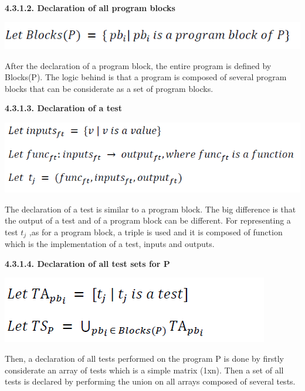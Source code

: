 \documentclass[conference,compsoc]{IEEEtran}
\begin{document}
\noindent
\newline
\textbf{4.3.1.2. Declaration of all program blocks}
\begin{center}
\includegraphics[scale=0.5]{Proof1-Part2.png} 
\end{center}

After the declaration of a program block, the entire program is defined by Blocks(P). The logic behind is that a program is composed of several program blocks that can be considerate as a set of program blocks. 

\noindent
\newline
\textbf{4.3.1.3. Declaration of a test}
\begin{center}
\includegraphics[scale=0.5]{Proof1-Part3.png} 
\end{center}

The declaration of a test is similar to a program block. The big difference is that the output of a test and of a program block can be different. For representing a test $t_j$ ,as for a program block, a triple is used and it is composed of function which is the implementation of a test, inputs and outputs.  

\noindent
\newline
\textbf{4.3.1.4. Declaration of all test sets for P}
\begin{center}
\includegraphics[scale=0.5]{Proof1-Part4.png} 
\end{center}

Then, a declaration of all tests performed on the program P is done by firstly considerate an array of tests which is a simple matrix (1xn). Then a set of all tests is declared by performing the union on all arrays composed of several tests. 
\end{document}
